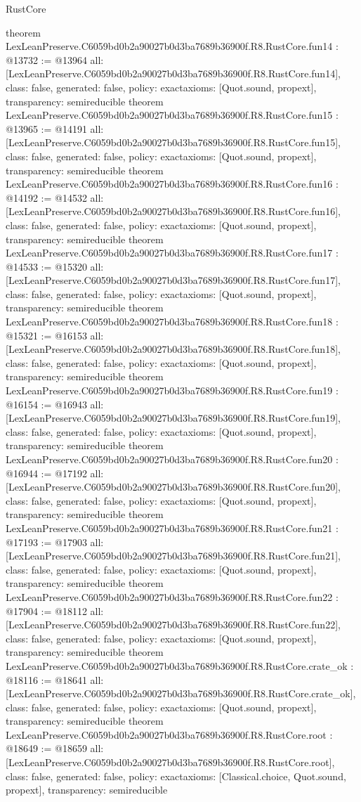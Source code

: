 \begin{lexlean}{RustCore}
\begin{coremodule}
{}
theorem LexLeanPreserve.C6059bd0b2a90027b0d3ba7689b36900f.R8.RustCore.fun14 : @13732 := @13964 {
  all: [LexLeanPreserve.C6059bd0b2a90027b0d3ba7689b36900f.R8.RustCore.fun14],
  class: false,
  generated: false,
  policy: exact{axioms: [Quot.sound, propext]},
  transparency: semireducible
}
theorem LexLeanPreserve.C6059bd0b2a90027b0d3ba7689b36900f.R8.RustCore.fun15 : @13965 := @14191 {
  all: [LexLeanPreserve.C6059bd0b2a90027b0d3ba7689b36900f.R8.RustCore.fun15],
  class: false,
  generated: false,
  policy: exact{axioms: [Quot.sound, propext]},
  transparency: semireducible
}
theorem LexLeanPreserve.C6059bd0b2a90027b0d3ba7689b36900f.R8.RustCore.fun16 : @14192 := @14532 {
  all: [LexLeanPreserve.C6059bd0b2a90027b0d3ba7689b36900f.R8.RustCore.fun16],
  class: false,
  generated: false,
  policy: exact{axioms: [Quot.sound, propext]},
  transparency: semireducible
}
theorem LexLeanPreserve.C6059bd0b2a90027b0d3ba7689b36900f.R8.RustCore.fun17 : @14533 := @15320 {
  all: [LexLeanPreserve.C6059bd0b2a90027b0d3ba7689b36900f.R8.RustCore.fun17],
  class: false,
  generated: false,
  policy: exact{axioms: [Quot.sound, propext]},
  transparency: semireducible
}
theorem LexLeanPreserve.C6059bd0b2a90027b0d3ba7689b36900f.R8.RustCore.fun18 : @15321 := @16153 {
  all: [LexLeanPreserve.C6059bd0b2a90027b0d3ba7689b36900f.R8.RustCore.fun18],
  class: false,
  generated: false,
  policy: exact{axioms: [Quot.sound, propext]},
  transparency: semireducible
}
theorem LexLeanPreserve.C6059bd0b2a90027b0d3ba7689b36900f.R8.RustCore.fun19 : @16154 := @16943 {
  all: [LexLeanPreserve.C6059bd0b2a90027b0d3ba7689b36900f.R8.RustCore.fun19],
  class: false,
  generated: false,
  policy: exact{axioms: [Quot.sound, propext]},
  transparency: semireducible
}
theorem LexLeanPreserve.C6059bd0b2a90027b0d3ba7689b36900f.R8.RustCore.fun20 : @16944 := @17192 {
  all: [LexLeanPreserve.C6059bd0b2a90027b0d3ba7689b36900f.R8.RustCore.fun20],
  class: false,
  generated: false,
  policy: exact{axioms: [Quot.sound, propext]},
  transparency: semireducible
}
theorem LexLeanPreserve.C6059bd0b2a90027b0d3ba7689b36900f.R8.RustCore.fun21 : @17193 := @17903 {
  all: [LexLeanPreserve.C6059bd0b2a90027b0d3ba7689b36900f.R8.RustCore.fun21],
  class: false,
  generated: false,
  policy: exact{axioms: [Quot.sound, propext]},
  transparency: semireducible
}
theorem LexLeanPreserve.C6059bd0b2a90027b0d3ba7689b36900f.R8.RustCore.fun22 : @17904 := @18112 {
  all: [LexLeanPreserve.C6059bd0b2a90027b0d3ba7689b36900f.R8.RustCore.fun22],
  class: false,
  generated: false,
  policy: exact{axioms: [Quot.sound, propext]},
  transparency: semireducible
}
theorem LexLeanPreserve.C6059bd0b2a90027b0d3ba7689b36900f.R8.RustCore.crate_ok : @18116 := @18641 {
  all: [LexLeanPreserve.C6059bd0b2a90027b0d3ba7689b36900f.R8.RustCore.crate_ok],
  class: false,
  generated: false,
  policy: exact{axioms: [Quot.sound, propext]},
  transparency: semireducible
}
theorem LexLeanPreserve.C6059bd0b2a90027b0d3ba7689b36900f.R8.RustCore.root : @18649 := @18659 {
  all: [LexLeanPreserve.C6059bd0b2a90027b0d3ba7689b36900f.R8.RustCore.root],
  class: false,
  generated: false,
  policy: exact{axioms: [Classical.choice, Quot.sound, propext]},
  transparency: semireducible
}


\end{coremodule}
\end{lexlean}

